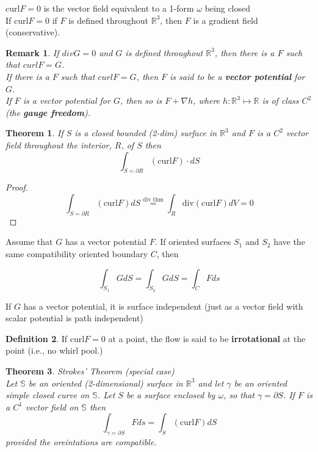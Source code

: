 \documentclass[12pt]{article}
\theoremstyle{plain}
\newtheorem*{remark}{Remark}
\newtheorem{theorem}{Theorem}[section]
\theoremstyle{definition}
\newtheorem{definition}[theorem]{Definition}
\begin{document}
$\text{curl} F = 0$ is the vector field equivalent to a 1-form $\omega$ being closed\\
If $\text{curl} F = 0$ if $F$ is defined throughout $\mathbb{R}^3$, then $F$ is a gradient field (conservative).

\begin{remark}
	If $div G = 0$ and $G$ is defined throughout $\mathbb{R}^3$, then there is a $F$ such that $curl F = G$.\\
	If there is a $F$ such that $curl F = G$, then $F$ is said to be a \textbf{vector potential} for $G$.\\
	If $F$ is a vector potential for $G$, then so is $F+\nabla h$, where $h:\mathbb{R}^3\mapsto\mathbb{R}$ is of class $C^2$ (the \textbf{gauge freedom}).
\end{remark}

\begin{theorem}
	If $S$ is a closed bounded (2-dim) surface in $\mathbb{R}^3$ and $F$ is a $C^2$ vector field throughout the interior, $R$, of $S$ then
	$$\int_{S = \partial R} (\text{curl} F)\cdot dS$$

\end{theorem}
\begin{proof}
	$$\int_{S = \partial R} (\text{curl} F) dS \overset{\text{div thm}}{=} \int_R \text{div}(\text{curl} F)dV = 0$$
\end{proof}

Assume that $G$ has a vector potential $F$. If oriented surfaces $S_1$ and $S_2$ have the same compatibility oriented boundary $C$, then

$$\int_{S_1} G dS = \int_{S_2} G dS = \int_C F ds$$

If $G$ has a vector potential, it is surface independent (just as a vector field with scalar potential is path independent)

\begin{definition}
	If $\text{curl} F = 0$ at a point, the flow is said to be \textbf{irrotational} at the point (i.e., no whirl pool.)
\end{definition}

\begin{theorem}
	Strokes' Theorem (special case)\\
	Let $\mathbb{S}$ be an oriented (2-dimensional) surface in $\mathbb{R}^3$ and let $\gamma$ be an oriented simple closed curve on $\mathbb{S}$. Let $S$ be a surface enclosed by $\omega$, so that $\gamma = \partial S$. If $F$ is a $C^1$ vector field on $\mathbb{S}$ then
	$$\int_{\gamma = \partial S} F ds = \int_S (\text{curl} F)dS$$
	provided the oreintations are compatible.
\end{theorem}
\end{document}
